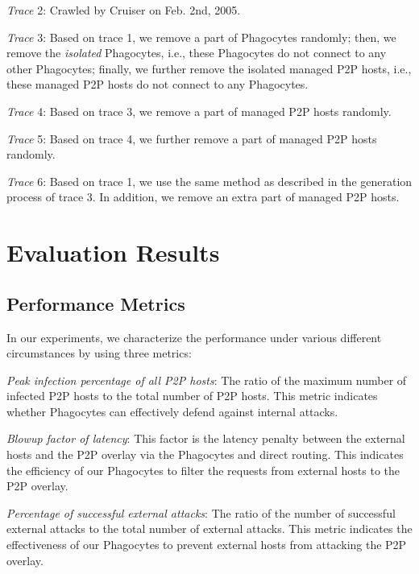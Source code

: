 \documentclass[times,10pt,twocolumn]{article}
\begin{document}
 \emph{Trace} 2: Crawled by Cruiser on Feb. 2nd, 2005.

 \emph{Trace} 3: Based on trace 1, we remove a part of
Phagocytes randomly; then, we remove the \emph{isolated} Phagocytes,
i.e., these Phagocytes do not connect to any other Phagocytes;
finally, we further remove the isolated managed P2P hosts, i.e.,
these managed P2P hosts do not connect to any Phagocytes.

 \emph{Trace} 4: Based on trace 3, we remove a part of
managed P2P hosts randomly.

 \emph{Trace} 5: Based on trace 4, we further remove a part
of managed P2P hosts randomly.

 \emph{Trace} 6: Based on trace 1, we use the same method
as described in the generation process of trace 3. In addition, we
remove an extra part of managed P2P hosts.





\section{Evaluation Results}
\label{sec:ExResults}



\subsection{Performance Metrics}

In our experiments, we characterize the performance under various
different circumstances by using three metrics:


 \emph{Peak infection percentage of all P2P hosts}: The
ratio of the maximum number of infected P2P hosts to the total
number of P2P hosts. This metric indicates whether Phagocytes can
effectively defend against internal attacks.

 \emph{Blowup factor of latency}: This factor is the
latency penalty between the external hosts and the P2P overlay via
the Phagocytes and direct routing. This indicates the efficiency of
our Phagocytes to filter the requests from external hosts to the P2P
overlay.

 \emph{Percentage of successful external attacks}: The
ratio of the number of successful external attacks to the total
number of external attacks. This metric indicates the effectiveness
of our Phagocytes to prevent external hosts from attacking the P2P
overlay.
\end{document}
